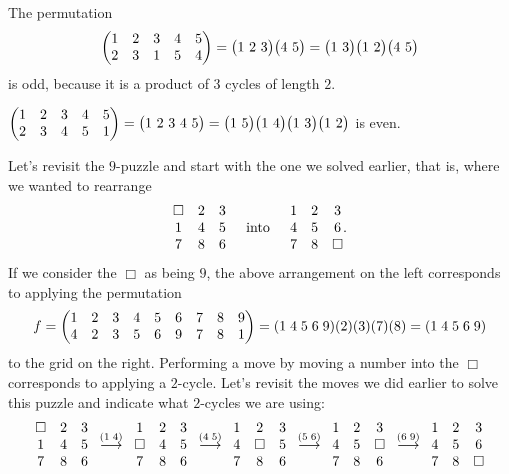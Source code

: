 \documentclass[11pt,dvipsnames]{book}
\numberwithin{figure}{section} %
\numberwithin{table}{section} %
\begin{document}
\begin{example}  The permutation
$$
\left(\begin{matrix} %
1 & 2 & 3 & 4 & 5 \cr%
2 & 3 & 1 & 5 & 4 \cr%
\end{matrix}\right)=\big(1\ 2\ 3\big)\big(4\ 5\big)=\big(1\ 3\big)\big(1\ 2\big)\big(4\ 5\big)
$$
 is odd,  because it is a product of $3$ cycles of
length $2$.


$\left(\begin{matrix} %
1 & 2 & 3 & 4 & 5 \cr%
2 & 3 & 4 & 5 & 1 \cr%
\end{matrix}\right)=\big(1\ 2\ 3\ 4\ 5\big)=\big(1\ 5\big)\big(1\ 4\big)\big(1\ 3\big)\big(1\ 2\big)
$  is even.
\end{example}



\begin{example}
Let's revisit the $9$-puzzle and start with the one we solved earlier, that is, where we wanted to rearrange 
\[\begin{matrix} %
 \Box  & 2  & 3  \cr%
1 & 4& 5 \cr%
7 & 8 & 6 \cr%
\end{matrix} \;\;\;\; \mbox{ into } \;\;\;\; \begin{matrix} %
1 & 2  & 3  \cr%
4 & 5 & 6  \cr%
7 & 8 & \Box \cr%
\end{matrix}.\]
If we consider the $\Box$ as being $9$, the above arrangement on the left corresponds to applying the permutation 
\[
f=\left(\begin{matrix} %
1 & 2 & 3 & 4 & 5 & 6 & 7 & 8 & 9 \cr%
4 & 2 & 3 & 5 & 6 & 9 & 7 & 8 & 1\cr%
\end{matrix}\right)
=(1 \; 4 \; 5 \; 6 \; 9 )(2)(3)(7)(8)=(1 \; 4 \; 5 \; 6 \; 9 )
\]
to the grid on the right. Performing a move by moving a number into the $\Box$ corresponds to applying a $2$-cycle. Let's revisit the moves we did earlier to solve this puzzle and indicate what $2$-cycles we are using:
\[
\begin{matrix} %
 \Box  & 2  & 3  \cr%
1 & 4& 5 \cr%
7 & 8 & 6 \cr%
\end{matrix}
\;\;
\stackrel{(1 \; 4)}{\longrightarrow}
\;\;
\begin{matrix} %
1 & 2  & 3  \cr%
 \Box  & 4& 5 \cr%
7 & 8 & 6 \cr%
\end{matrix}
\;\;
\stackrel{(4 \; 5)}{\longrightarrow}
\;\;
\begin{matrix} %
1 & 2  & 3  \cr%
4 &  \Box  & 5 \cr%
7 & 8 & 6 \cr%
\end{matrix}
\;\;
\stackrel{(5 \; 6)}{\longrightarrow}
\;\;
\begin{matrix} %
1 & 2  & 3  \cr%
4 & 5 & \Box  \cr%
7 & 8 & 6 \cr%
\end{matrix}
\;\;
\stackrel{(6 \; 9)}{\longrightarrow}
\;\;
\begin{matrix} %
1 & 2  & 3  \cr%
4 & 5 & 6  \cr%
7 & 8 & \Box \cr%
\end{matrix}
\]


\end{example}
\end{document}
